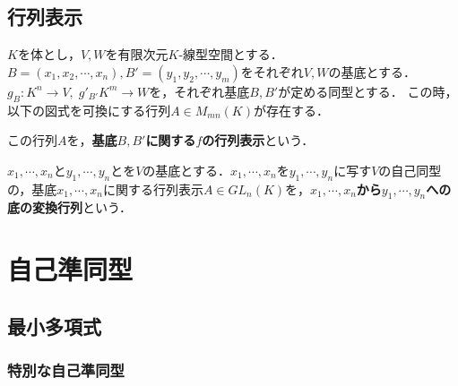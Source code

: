 \documentclass[uplatex, 12pt, dvipdfmx]{jsreport}
\begin{document}
\section{行列表示}

\begin{shadebox}\begin{definition}
    $K$を体とし，$V,W$を有限次元$K$-線型空間とする．$B=(x_1,x_2,\cdots,x_n), B'=(y_1,y_2,\cdots,y_m)$をそれぞれ$V,W$の基底とする．$g_B:K^n\longrightarrow V,\; g'_{B'}K^m\longrightarrow W$を，それぞれ基底$B,B'$が定める同型とする．
    この時，以下の図式を可換にする行列$A\in M_{mn}(K)$が存在する．
    \begin{center}\end{center}
    この行列$A$を，\textbf{基底$B,B'$に関する$f$の行列表示}という．
\end{definition}\end{shadebox}

\begin{definition}
    $x_1,\cdots,x_n$と$y_1,\cdots,y_n$とを$V$の基底とする．$x_1,\cdots,x_n$を$y_1,\cdots,y_n$に写す$V$の自己同型の，基底$x_1,\cdots,x_n$に関する行列表示$A\in GL_n(K)$を，\textbf{$x_1,\cdots,x_n$から$y_1,\cdots,y_n$への底の変換行列}という．
\end{definition}

\chapter{自己準同型}
\section{最小多項式}
\subsection{特別な自己準同型}
\end{document}
